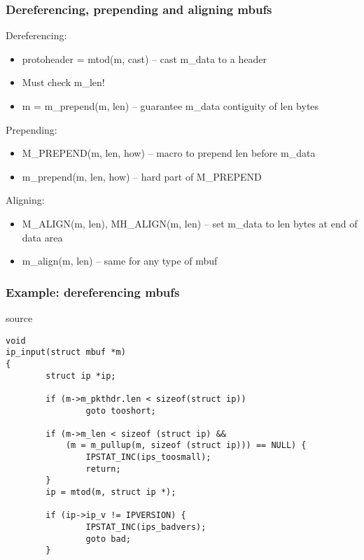 \documentclass{beamer}
\begin{document}
\begin{frame}
\frametitle{Dereferencing, prepending and aligning mbufs}
  \begin{itemize}
    \item{Dereferencing:
	\begin{itemize}
	  \item{protoheader = mtod(m, cast) -- cast m\_data to a header}
	  \item{Must check m\_len!}
	  \item{m = m\_prepend(m, len) --
		guarantee m\_data contiguity of len bytes}
	\end{itemize}
    }
 {
    \item{Prepending:
	\begin{itemize}
	  \item{M\_PREPEND(m, len, how) -- macro to prepend len before m\_data}
	  \item{m\_prepend(m, len, how) -- hard part of M\_PREPEND}
	\end{itemize}
    }
}
 {
    \item{Aligning:
	\begin{itemize}
	  \item{M\_ALIGN(m, len), MH\_ALIGN(m, len) -- set m\_data to len bytes
		at end of data area}
	  \item{m\_align(m, len) -- same for any type of mbuf}
	\end{itemize}
    }
}
  \end{itemize}
\end{frame}


\begin{frame}[fragile]
\frametitle{Example: dereferencing mbufs}
\begin{beamercolorbox}[rounded=true,shadow=true]{source}
\lstset{language=C}
\scriptsize\begin{lstlisting}
void
ip_input(struct mbuf *m)
{
        struct ip *ip;

        if (m->m_pkthdr.len < sizeof(struct ip))
                goto tooshort;

        if (m->m_len < sizeof (struct ip) &&
            (m = m_pullup(m, sizeof (struct ip))) == NULL) {
                IPSTAT_INC(ips_toosmall);
                return;
        }
        ip = mtod(m, struct ip *);

        if (ip->ip_v != IPVERSION) {
                IPSTAT_INC(ips_badvers);
                goto bad;
        }
\end{lstlisting}
\end{beamercolorbox}
\end{frame}
\end{document}
